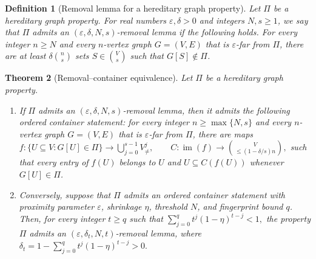 \documentclass[11pt,reqno,letterpaper]{amsart}
\theoremstyle{plain}
\newtheorem{thm}{Theorem}[section]
\newtheorem{defn}[thm]{Definition}
\theoremstyle{remark}
\begin{document}
\begin{defn}[Removal lemma for a hereditary graph property]
Let $\Pi$ be a hereditary graph property. For real numbers $\varepsilon,\delta>0$ and integers $N,s\ge 1$, we say that $\Pi$ admits an $(\varepsilon,\delta,N,s)$-removal lemma if the following holds. For every integer $n\ge N$ and every $n$-vertex graph $G=(V,E)$ that is $\varepsilon$-far from $\Pi$, there are at least $\delta\binom{n}{s}$ sets $S\in\binom{V}{s}$ such that $G[S]\notin \Pi$.
\end{defn}

\begin{thm}[Removal--container equivalence]\label{thm:removal-container-equivalence}
Let $\Pi$ be a hereditary graph property.
\begin{enumerate}
\item If $\Pi$ admits an $(\varepsilon,\delta,N,s)$-removal lemma, then it
admits the following ordered container statement: for every integer
$n\geq\max\{N,s\}$ and every $n$-vertex graph $G=(V,E)$ that is
$\varepsilon$-far from $\Pi$, there are maps
\(f:\{U\subseteq V:G[U]\in\Pi\} \longrightarrow \bigcup_{j=0}^{s-1}V_{\neq}^{j}, \qquad C:\operatorname{im}(f) \longrightarrow \binom{V}{\leq(1-\delta/s)n},\)
such that every entry of $f(U)$ belongs to $U$ and
$U\subseteq C(f(U))$ whenever $G[U]\in\Pi$.

\item Conversely, suppose that $\Pi$ admits an ordered container statement
with proximity parameter $\varepsilon$, shrinkage $\eta$, threshold $N$,
and fingerprint bound $q$.  Then, for every integer $t\geq q$ such that
\(\sum_{j=0}^{q}t^j(1-\eta)^{t-j}<1,\)
the property $\Pi$ admits an $(\varepsilon,\delta_t,N,t)$-removal lemma,
where
\(\delta_t=1-\sum_{j=0}^{q}t^j(1-\eta)^{t-j}>0.\)
\end{enumerate}
\end{thm}
\end{document}
